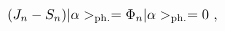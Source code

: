 \begin{equation}
(J_n - S_n)  | \alpha >_{{\rm ph.}} = \Phi_n  | \alpha >_{{\rm ph.}} = 0~, \label{eq:belliuc}
\end{equation}

